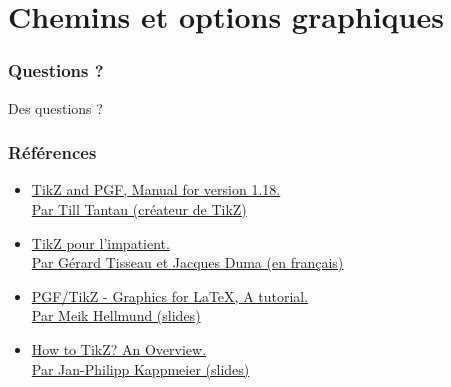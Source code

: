 \documentclass{clic_latex_beamer}
\begin{document}

\section{Chemins et options graphiques}
\begin{frame}[fragile]
\frametitle{}

\end{frame}
  
 
 
\begin{frame}
\frametitle{Questions ?}
\begin{center}
\Huge Des questions ?
\end{center}
\end{frame}
 
\begin{frame}
\frametitle{Références}
\begin{itemize}
\item \href{http://paws.wcu.edu/tsfoguel/tikzpgfmanual.pdf }{TikZ and PGF, Manual for version 1.18.\\Par Till Tantau (créateur de TikZ)}
\item \href{http://math.et.info.free.fr/TikZ/bdd/TikZ-Impatient.pdf}{TikZ pour l’impatient.\\Par Gérard Tisseau et Jacques Duma (en français)}
\item \href{http://www.math.uni-leipzig.de/~hellmund/LaTeX/pgf-tut.pdf}{PGF/TikZ - Graphics for LaTeX, A tutorial.\\Par Meik Hellmund (slides)}
\item \href{https://www.coga.tu-berlin.de/fileadmin/i26/download/AG_DiskAlg/FG_KombOptGraphAlg/kappmeier/How_to_TikZ_-_current.pdf}{How to TikZ? An Overview.\\Par Jan-Philipp Kappmeier (slides)}
\end{itemize}
\end{frame}
\end{document}
